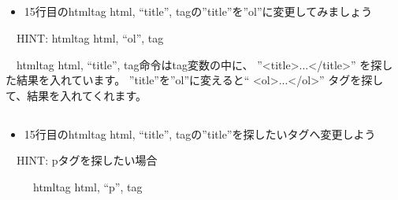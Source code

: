 \subsection*{\theQuestion\label{Q:ol}}
\begin{itemize}
\item 15行目のhtmltag html, “title”, tagの”title”を”ol”に変更してみましょう
\end{itemize}
\ \ HINT: htmltag html, “ol”, tag

\ \ htmltag html, “title”,
tag命令はtag変数の中に、
”{\textless}title{\textgreater}...{\textless}/title{\textgreater}”
を探した結果を入れています。
”title”を”ol”に変えると“
{\textless}ol{\textgreater}...{\textless}/ol{\textgreater}”
タグを探して、結果を入れてくれます。

\subsection*{\theQuestion\label{Q:tag}}
\begin{itemize}
\item 15行目のhtmltag html, “title”, tagの”title”を探したいタグへ変更しよう
\end{itemize}
\ \ HINT: pタグを探したい場合

\ \ \ \ \ htmltag html, “p”, tag
